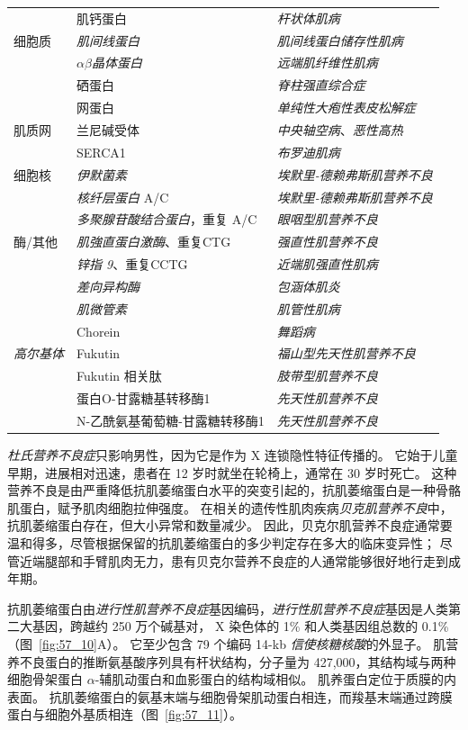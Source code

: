 \begin{table}[htbp]
\begin{tabular}{lll}
		 & 肌钙蛋白 & \textit{杆状体肌病} \\
		细胞质 & \textit{肌间线蛋白} & \textit{肌间线蛋白储存性肌病} \\
		 & $\alpha \beta$\textit{晶体蛋白} & \textit{远端肌纤维性肌病} \\
		 & 硒蛋白 & \textit{脊柱强直综合症} \\
		 & 网蛋白 & \textit{单纯性大疱性表皮松解症} \\
		肌质网 & 兰尼碱受体 & \textit{中央轴空病}、\textit{恶性高热} \\
		 & SERCA1 & \textit{布罗迪肌病} \\
		细胞核 & \textit{伊默菌素} & \textit{埃默里-德赖弗斯肌营养不良} \\
		 & \textit{核纤层蛋白} A/C & \textit{埃默里-德赖弗斯肌营养不良} \\
		 & \textit{多聚腺苷酸结合蛋白}，重复 A/C & \textit{眼咽型肌营养不良} \\
		酶/其他 & \textit{肌強直蛋白激酶}、重复CTG & \textit{强直性肌营养不良} \\
		 & \textit{锌指 9}、重复CCTG & \textit{近端肌强直性肌病} \\
		 & \textit{差向异构酶} & \textit{包涵体肌炎} \\
		 & \textit{肌微管素} & \textit{肌管性肌病} \\
		 & Chorein & \textit{舞蹈病} \\
		\textit{高尔基体} & Fukutin & \textit{福山型先天性肌营养不良} \\
		 & Fukutin 相关肽 & \textit{肢带型肌营养不良} \\
		 & 蛋白O-甘露糖基转移酶1 & \textit{先天性肌营养不良} \\
		 & N-乙酰氨基葡萄糖-甘露糖转移酶1 & \textit{先天性肌营养不良} \\
		\bottomrule
	\end{tabular}
\end{table}


\textit{杜氏营养不良症}只影响男性，因为它是作为 X 连锁隐性特征传播的。
它始于儿童早期，进展相对迅速，患者在 12 岁时就坐在轮椅上，通常在 30 岁时死亡。
这种营养不良是由严重降低抗肌萎缩蛋白水平的突变引起的，抗肌萎缩蛋白是一种骨骼肌蛋白，赋予肌肉细胞拉伸强度。
在相关的遗传性肌肉疾病\textit{贝克肌营养不良}中，抗肌萎缩蛋白存在，但大小异常和数量减少。
因此，贝克尔肌营养不良症通常要温和得多，尽管根据保留的抗肌萎缩蛋白的多少判定存在多大的临床变异性；
尽管近端腿部和手臂肌肉无力，患有贝克尔营养不良症的人通常能够很好地行走到成年期。


抗肌萎缩蛋白由\textit{进行性肌营养不良症}基因编码，\textit{进行性肌营养不良症}基因是人类第二大基因，跨越约 250 万个碱基对， X 染色体的 1\% 和人类基因组总数的 0.1\%（图~\ref{fig:57_10}A）。
它至少包含 79 个编码 14-kb \textit{信使核糖核酸}的外显子。
肌营养不良蛋白的推断氨基酸序列具有杆状结构，分子量为 427,000，其结构域与两种细胞骨架蛋白 $ \alpha $-辅肌动蛋白和血影蛋白的结构域相似。
肌养蛋白定位于质膜的内表面。
抗肌萎缩蛋白的氨基末端与细胞骨架肌动蛋白相连，而羧基末端通过跨膜蛋白与细胞外基质相连（图~\ref{fig:57_11}）。


